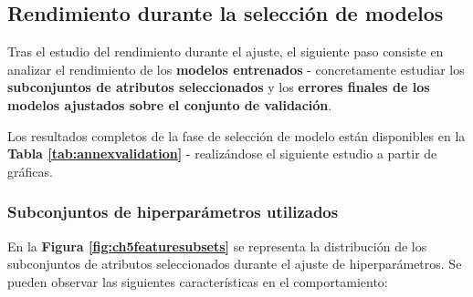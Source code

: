 \subsection{Rendimiento durante la selección de modelos}

Tras el estudio del rendimiento durante el ajuste, el siguiente paso consiste en analizar el rendimiento de los \textbf{modelos entrenados} - concretamente estudiar los \textbf{subconjuntos de atributos seleccionados} y los \textbf{errores finales de los modelos ajustados sobre el conjunto de validación}.

Los resultados completos de la fase de selección de modelo están disponibles en la \textbf{Tabla \ref{tab:annexvalidation}} - realizándose el siguiente estudio a partir de gráficas.

\subsubsection{Subconjuntos de hiperparámetros utilizados}

En la \textbf{Figura \ref{fig:ch5featuresubsets}} se representa la distribución de los subconjuntos de atributos seleccionados durante el ajuste de hiperparámetros. Se pueden observar las siguientes características en el comportamiento:

